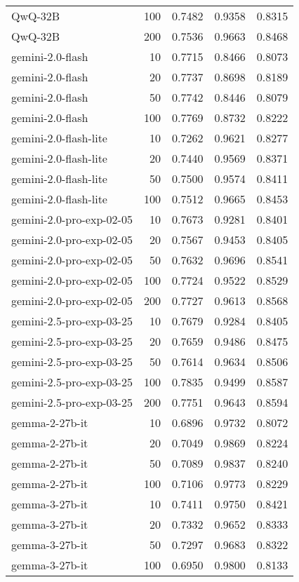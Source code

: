 \begin{tabular}{lrrrr}
QwQ-32B & 100 & 0.7482 & 0.9358 & 0.8315 \\
QwQ-32B & 200 & 0.7536 & 0.9663 & 0.8468 \\
gemini-2.0-flash & 10 & 0.7715 & 0.8466 & 0.8073 \\
gemini-2.0-flash & 20 & 0.7737 & 0.8698 & 0.8189 \\
gemini-2.0-flash & 50 & 0.7742 & 0.8446 & 0.8079 \\
gemini-2.0-flash & 100 & 0.7769 & 0.8732 & 0.8222 \\
gemini-2.0-flash-lite & 10 & 0.7262 & 0.9621 & 0.8277 \\
gemini-2.0-flash-lite & 20 & 0.7440 & 0.9569 & 0.8371 \\
gemini-2.0-flash-lite & 50 & 0.7500 & 0.9574 & 0.8411 \\
gemini-2.0-flash-lite & 100 & 0.7512 & 0.9665 & 0.8453 \\
gemini-2.0-pro-exp-02-05 & 10 & 0.7673 & 0.9281 & 0.8401 \\
gemini-2.0-pro-exp-02-05 & 20 & 0.7567 & 0.9453 & 0.8405 \\
gemini-2.0-pro-exp-02-05 & 50 & 0.7632 & 0.9696 & 0.8541 \\
gemini-2.0-pro-exp-02-05 & 100 & 0.7724 & 0.9522 & 0.8529 \\
gemini-2.0-pro-exp-02-05 & 200 & 0.7727 & 0.9613 & 0.8568 \\
gemini-2.5-pro-exp-03-25 & 10 & 0.7679 & 0.9284 & 0.8405 \\
gemini-2.5-pro-exp-03-25 & 20 & 0.7659 & 0.9486 & 0.8475 \\
gemini-2.5-pro-exp-03-25 & 50 & 0.7614 & 0.9634 & 0.8506 \\
gemini-2.5-pro-exp-03-25 & 100 & 0.7835 & 0.9499 & 0.8587 \\
gemini-2.5-pro-exp-03-25 & 200 & 0.7751 & 0.9643 & 0.8594 \\
gemma-2-27b-it & 10 & 0.6896 & 0.9732 & 0.8072 \\
gemma-2-27b-it & 20 & 0.7049 & 0.9869 & 0.8224 \\
gemma-2-27b-it & 50 & 0.7089 & 0.9837 & 0.8240 \\
gemma-2-27b-it & 100 & 0.7106 & 0.9773 & 0.8229 \\
gemma-3-27b-it & 10 & 0.7411 & 0.9750 & 0.8421 \\
gemma-3-27b-it & 20 & 0.7332 & 0.9652 & 0.8333 \\
gemma-3-27b-it & 50 & 0.7297 & 0.9683 & 0.8322 \\
gemma-3-27b-it & 100 & 0.6950 & 0.9800 & 0.8133 \\

\end{tabular}
